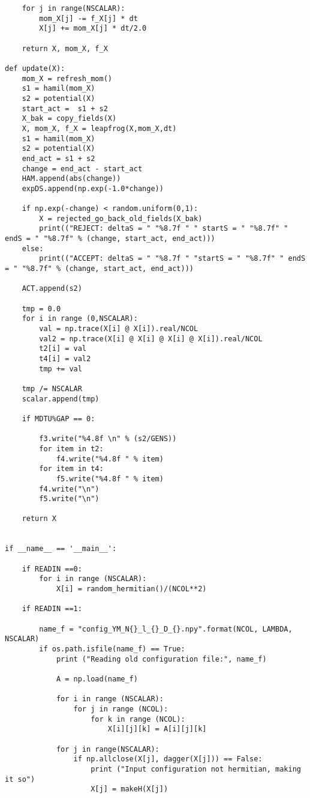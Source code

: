 \begin{lstlisting}
    for j in range(NSCALAR):
        mom_X[j] -= f_X[j] * dt
        X[j] += mom_X[j] * dt/2.0
    
    return X, mom_X, f_X

def update(X):
    mom_X = refresh_mom()
    s1 = hamil(mom_X)
    s2 = potential(X)
    start_act =  s1 + s2
    X_bak = copy_fields(X) 
    X, mom_X, f_X = leapfrog(X,mom_X,dt)
    s1 = hamil(mom_X)
    s2 = potential(X)
    end_act = s1 + s2
    change = end_act - start_act
    HAM.append(abs(change))
    expDS.append(np.exp(-1.0*change))   

    if np.exp(-change) < random.uniform(0,1):
        X = rejected_go_back_old_fields(X_bak)
        print(("REJECT: deltaS = " "%8.7f " " startS = " "%8.7f" " endS = " "%8.7f" % (change, start_act, end_act)))
    else:   
        print(("ACCEPT: deltaS = " "%8.7f " "startS = " "%8.7f" " endS = " "%8.7f" % (change, start_act, end_act)))

    ACT.append(s2)

    tmp = 0.0 
    for i in range (0,NSCALAR):
        val = np.trace(X[i] @ X[i]).real/NCOL
        val2 = np.trace(X[i] @ X[i] @ X[i] @ X[i]).real/NCOL
        t2[i] = val 
        t4[i] = val2 
        tmp += val 

    tmp /= NSCALAR 
    scalar.append(tmp) 

    if MDTU%GAP == 0:

        f3.write("%4.8f \n" % (s2/GENS))
        for item in t2:
            f4.write("%4.8f " % item)
        for item in t4:
            f5.write("%4.8f " % item)
        f4.write("\n")
        f5.write("\n") 

    return X


if __name__ == '__main__':

    if READIN ==0:
        for i in range (NSCALAR):  
            X[i] = random_hermitian()/(NCOL**2)  

    if READIN ==1:

        name_f = "config_YM_N{}_l_{}_D_{}.npy".format(NCOL, LAMBDA, NSCALAR)
        if os.path.isfile(name_f) == True: 
            print ("Reading old configuration file:", name_f)
            
            A = np.load(name_f)

            for i in range (NSCALAR):
                for j in range (NCOL):
                    for k in range (NCOL):
                        X[i][j][k] = A[i][j][k] 

            for j in range(NSCALAR):
                if np.allclose(X[j], dagger(X[j])) == False:
                    print ("Input configuration not hermitian, making it so")
                    X[j] = makeH(X[j])


\end{lstlisting}
